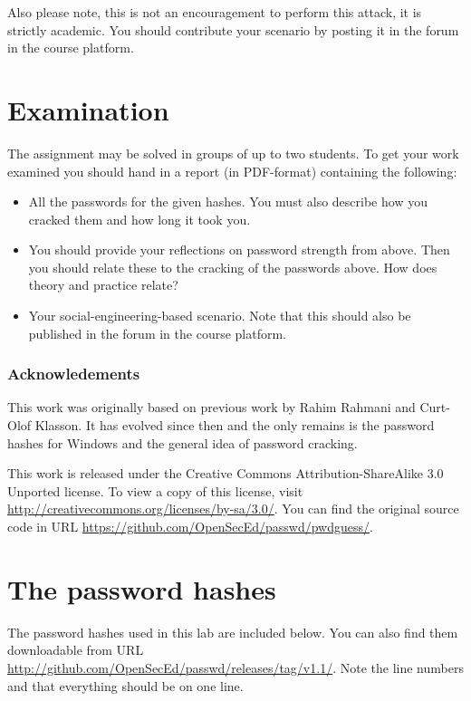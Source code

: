Also please note, this is not an encouragement to perform this attack, it is 
strictly academic.
You should contribute your scenario by posting it in the forum in the course 
platform.


\section{Examination}%
\label{sec:exam}

The assignment may be solved in groups of up to two students.
To get your work examined you should hand in a report (in PDF-format) 
containing the following:
\begin{itemize}
  \item All the passwords for the given hashes.
    You must also describe how you cracked them and how long it took you.

  \item You should provide your reflections on password strength from above.
    Then you should relate these to the cracking of the passwords above.
    How does theory and practice relate?

  \item Your social-engineering-based scenario.
    Note that this should also be published in the forum in the course platform.
\end{itemize}


\subsubsection*{Acknowledements}

This work was originally based on previous work by Rahim Rahmani and Curt-Olof 
Klasson.
It has evolved since then and the only remains is the password hashes for 
Windows and the general idea of password cracking.

This work is released under the Creative Commons Attribution-ShareAlike 3.0 
Unported license.
To view a copy of this license, visit 
\url{http://creativecommons.org/licenses/by-sa/3.0/}.
You can find the original source code in URL 
\url{https://github.com/OpenSecEd/passwd/pwdguess/}.


\printbibliography{}


\appendix
\section{The password hashes}%
\label{sec:hashes}

The password hashes used in this lab are included below.
You can also find them downloadable from URL
\url{http://github.com/OpenSecEd/passwd/releases/tag/v1.1/}.
Note the line numbers and that everything should be on one line.

